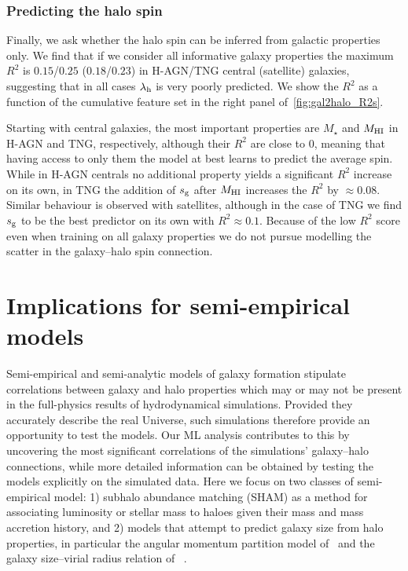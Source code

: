 \documentclass[useAMS,usenatbib]{mnras}
\begin{document}
\subsubsection{Predicting the halo spin}

Finally, we ask whether the halo spin can be inferred from galactic properties only. We find that if we consider all informative galaxy properties the maximum $R^2$ is $0.15$/$0.25$ ($0.18$/$0.23$) in H-AGN/TNG central (satellite) galaxies, suggesting that in all cases $\lambda_{\rm h}$ is very poorly predicted. We show the $R^2$ as a function of the cumulative feature set in the right panel of~\cref{fig:gal2halo_R2s}.

Starting with central galaxies, the most important properties are $M_\star$ and $M_{\rm HI}$ in H-AGN and TNG, respectively, although their $R^2$ are close to $0$, meaning that having access to only them the model at best learns to predict the average spin. While in H-AGN centrals no additional property yields a significant $R^2$ increase on its own, in TNG the addition of $s_{\rm g}$ after $M_{\rm HI}$ increases the $R^2$ by $\approx 0.08$. Similar behaviour is observed with satellites, although in the case of TNG we find $s_{\rm g}$ to be the best predictor on its own with $R^2\approx0.1$. Because of the low $R^2$ score even when training on all galaxy properties we do not pursue modelling the scatter in the galaxy--halo spin connection.



\section{Implications for semi-empirical models}
\label{sec:test_sam}

Semi-empirical and semi-analytic models of galaxy formation stipulate correlations between galaxy and halo properties which may or may not be present in the full-physics results of hydrodynamical simulations. Provided they accurately describe the real Universe, such simulations therefore provide an opportunity to test the models. Our ML analysis contributes to this by uncovering the most significant correlations of the simulations' galaxy--halo connections, while more detailed information can be obtained by testing the models explicitly on the simulated data. Here we focus on two classes of semi-empirical model: 1) subhalo abundance matching (SHAM) as a method for associating luminosity or stellar mass to haloes given their mass and mass accretion history, and 2) models that attempt to predict galaxy size from halo properties, in particular the angular momentum partition model of~\cite{Fall_Efstathiou_1980,MMW_1998} and the galaxy size--virial radius relation of ~\cite{Kravtsov_2013}.
\end{document}
